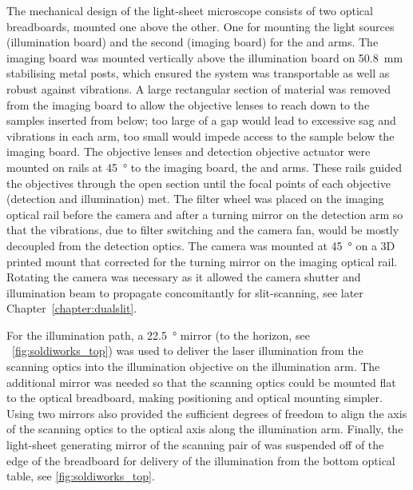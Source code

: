 The mechanical design of the \gls{light-sheet} microscope consists of two optical breadboards, mounted one above the other.
One for mounting the light sources (\gls{illumination board}) and the second (\gls{imaging board}) for the  and  arms.
The \gls{imaging board} was mounted vertically above the \gls{illumination board} on \SI{50.8}{\milli\metre} stabilising metal posts, which ensured the system was transportable as well as robust against vibrations.
A large rectangular section of material was removed from the \gls{imaging board} to allow the objective lenses to reach down to the samples inserted from below; too large of a gap would lead to excessive sag and vibrations in each arm, too small would impede access to the sample below the imaging board.
The objective lenses and detection objective actuator were mounted on rails at \SI{45}{\degree} to the \gls{imaging board}, the  and  arms.
These rails guided the objectives through the open section until the focal points of each objective (detection and illumination) met.
The filter wheel was placed on the \gls{imaging optical rail} before the camera and after a turning mirror on the \gls{detection arm}
so that the vibrations, due to
filter switching and the camera fan, would be mostly decoupled from the detection optics.
The camera was mounted at \SI{45}{\degree} on a \gls{3D} printed mount that corrected for the turning mirror on the \gls{imaging optical rail}.
Rotating the camera was necessary as it allowed the camera shutter and illumination beam to propagate concomitantly for slit-scanning, see later Chapter~\ref{chapter:dualslit}.

For the illumination path, a \SI{22.5}{\degree} mirror
(to the horizon, see \figurename~\ref{fig:soldiworks_top})
was used to deliver the laser illumination from the scanning optics into the illumination objective on the \gls{illumination arm}.
The additional mirror was needed so that the scanning optics could be mounted flat to the optical breadboard, making positioning and optical mounting simpler.
Using two mirrors also provided the sufficient degrees of freedom to align the axis of the scanning optics to the optical axis along the \gls{illumination arm}.
Finally, the light-sheet generating mirror of the scanning pair of was suspended off of the edge of the breadboard for delivery of the  illumination from the bottom optical table, see \figurename\ref{fig:soldiworks_top}.

